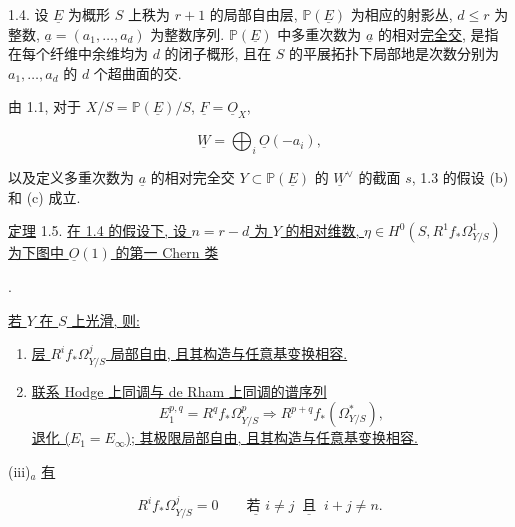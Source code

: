 
1.4. 设 $\underline E$ 为概形 $S$ 上秩为 $r+1$ 的局部自由层, $\mathbb P(\underline E)$ 为相应的射影丛, $d\leq r$ 为整数, $\underline a=(a_1,\ldots,a_d)$ 为整数序列. $\mathbb P(\underline E)$ 中多重次数为 $\underline a$ 的相对\underline{完全交}, 是指在每个纤维中余维均为 $d$ 的闭子概形, 且在 $S$ 的平展拓扑下局部地是次数分别为 $a_1,\ldots,a_d$ 的 $d$ 个超曲面的交.

由 1.1, 对于 $X/S=\mathbb P(\underline E)/S$, $\underline F=\underline O_X$,

\begin{equation*}
\underline W=\bigoplus_i\underline O(-a_i),
\end{equation*}

以及定义多重次数为 $\underline a$ 的相对完全交 $Y\subset\mathbb P(\underline E)$ 的 $\underline W^\vee$ 的截面 $s$, 1.3 的假设 (b) 和 (c) 成立.

\underline{定理} 1.5. \underline{在 1.4 的假设下, 设 $n=r-d$ 为 $Y$ 的相对维数, $\eta\in H^0(S,R^1f_*\Omega^1_{Y/S})$ 为下图中 $\underline O(1)$ 的第一 Chern 类}

\begin{center}
\qquad .
\end{center}

\underline{若 $Y$ 在 $S$ 上光滑, 则:}

\begin{enumerate}[label=(\roman*),leftmargin=2.6em]
\item \underline{层 $R^if_*\Omega^j_{Y/S}$ 局部自由, 且其构造与任意基变换相容.}

\item \underline{联系 Hodge 上同调与 de Rham 上同调的谱序列}
\begin{equation*}
E_1^{p,q}=R^qf_*\Omega^p_{Y/S}\Longrightarrow
R^{p+q}f_*(\Omega^*_{Y/S}),
\end{equation*}
\underline{退化 ($E_1=E_\infty$); 其极限局部自由, 且其构造与任意基变换相容.}
\end{enumerate}

\noindent(iii)$_a$ \underline{有}

\begin{equation*}
R^if_*\Omega^j_{Y/S}=0
\qquad\underline{\text{若 }}i\ne j\ \underline{\text{ 且 }}\ i+j\ne n.
\end{equation*}

